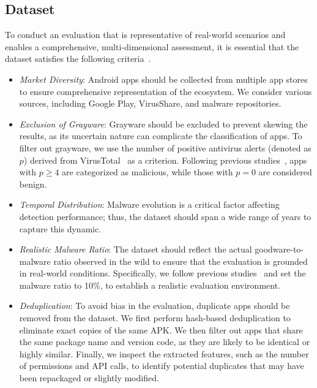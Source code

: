 \subsection{Dataset}
\label{sec:dataset}

To conduct an evaluation that is representative of real-world scenarios and enables a comprehensive, multi-dimensional assessment, it is essential that the dataset satisfies the following criteria~\cite{pendlebury2019tesseract}.
\begin{itemize}[leftmargin=14pt]
    \item \textit{Market Diversity}: Android apps should be collected from multiple app stores to ensure comprehensive representation of the ecosystem. We consider various sources, including Google Play, VirusShare, and malware repositories.
    \item \textit{Exclusion of Grayware}: Grayware should be excluded to prevent skewing the results, as its uncertain nature can complicate the classification of apps. To filter out grayware, we use the number of positive antivirus alerts (denoted as $p$) derived from VirusTotal~\cite{virustotal} as a criterion. Following previous studies~\cite{pendlebury2019tesseract,miller2016reviewer}, apps with $p\geq 4$ are categorized as malicious, while those with $p=0$ are considered benign.
    \item \textit{Temporal Distribution}: Malware evolution is a critical factor affecting detection performance; thus, the dataset should span a wide range of years to capture this dynamic.
    \item \textit{Realistic Malware Ratio}: The dataset should reflect the actual goodware-to-malware ratio observed in the wild to ensure that the evaluation is grounded in real-world conditions. Specifically, we follow previous studies~\cite{pendlebury2019tesseract,chen2023continuous} and set the malware ratio to 10\%, to establish a realistic evaluation environment.
    \item \textit{Deduplication}: To avoid bias in the evaluation, duplicate apps should be removed from the dataset. We first perform hash-based deduplication to eliminate exact copies of the same APK. We then filter out apps that share the same package name and version code, as they are likely to be identical or highly similar. Finally, we inspect the extracted features, such as the number of permissions and API calls, to identify potential duplicates that may have been repackaged or slightly modified.
\end{itemize}


